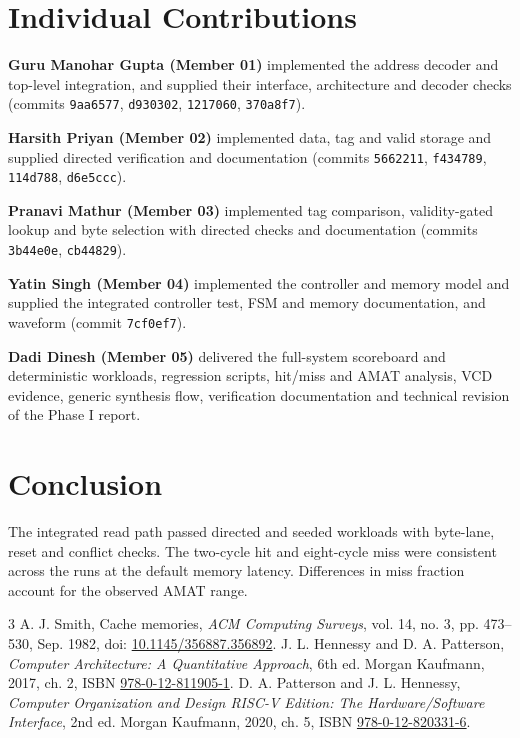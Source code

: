 \documentclass[conference]{IEEEtran}
\begin{document}
\section{Individual Contributions}
\textbf{Guru Manohar Gupta (Member 01)} implemented the address decoder and top-level integration, and supplied their interface, architecture and decoder checks (commits \texttt{9aa6577}, \texttt{d930302}, \texttt{1217060}, \texttt{370a8f7}).

\textbf{Harsith Priyan (Member 02)} implemented data, tag and valid storage and supplied directed verification and documentation (commits \texttt{5662211}, \texttt{f434789}, \texttt{114d788}, \texttt{d6e5ccc}).

\textbf{Pranavi Mathur (Member 03)} implemented tag comparison, validity-gated lookup and byte selection with directed checks and documentation (commits \texttt{3b44e0e}, \texttt{cb44829}).

\textbf{Yatin Singh (Member 04)} implemented the controller and memory model and supplied the integrated controller test, FSM and memory documentation, and waveform (commit \texttt{7cf0ef7}).

\textbf{Dadi Dinesh (Member 05)} delivered the full-system scoreboard and deterministic workloads, regression scripts, hit/miss and AMAT analysis, VCD evidence, generic synthesis flow, verification documentation and technical revision of the Phase I report.

\section{Conclusion}
The integrated read path passed directed and seeded workloads with byte-lane, reset and conflict checks. The two-cycle hit and eight-cycle miss were consistent across the runs at the default memory latency. Differences in miss fraction account for the observed AMAT range.

\begin{thebibliography}{3}
 A. J. Smith, Cache memories, \emph{ACM Computing Surveys}, vol. 14, no. 3, pp. 473--530, Sep. 1982, doi: \href{https://doi.org/10.1145/356887.356892}{10.1145/356887.356892}.
 J. L. Hennessy and D. A. Patterson, \emph{Computer Architecture: A Quantitative Approach}, 6th ed. Morgan Kaufmann, 2017, ch. 2, ISBN \href{https://shop.elsevier.com/books/computer-architecture/hennessy/978-0-12-811905-1}{978-0-12-811905-1}.
 D. A. Patterson and J. L. Hennessy, \emph{Computer Organization and Design RISC-V Edition: The Hardware/Software Interface}, 2nd ed. Morgan Kaufmann, 2020, ch. 5, ISBN \href{https://www.educate.elsevier.com/book/details/9780128203316}{978-0-12-820331-6}.
\end{thebibliography}
\end{document}
